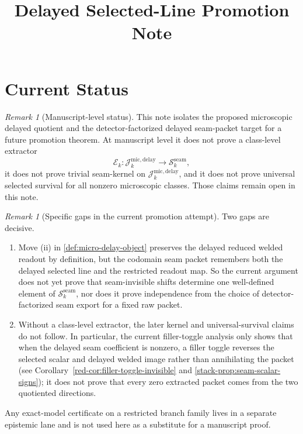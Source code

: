 \documentclass[11pt]{article}
\title{Delayed Selected-Line Promotion Note}
\author{}
\date{}
\theoremstyle{definition}
\theoremstyle{plain}
\theoremstyle{remark}
\newtheorem{remark}[definition]{Remark}
\begin{document}
\maketitle

\section{Current Status}

\begin{remark}[Manuscript-level status]
\label{rem:promotion-manuscript-status}
This note isolates the proposed microscopic delayed quotient and the detector-factorized delayed
seam-packet target for a future promotion theorem.
At manuscript level it does not prove a class-level extractor
\[
\mathcal E_k:
\mathcal J^{\mathrm{mic,delay}}_k
\longrightarrow
\mathcal S^{\mathrm{seam}}_k,
\]
it does not prove trivial seam-kernel on \(\mathcal J^{\mathrm{mic,delay}}_k\), and it does not
prove universal selected survival for all nonzero microscopic classes.
Those claims remain open in this note.
\end{remark}

\begin{remark}[Specific gaps in the current promotion attempt]
\label{rem:promotion-gaps}
Two gaps are decisive.
\begin{enumerate}[leftmargin=2em]
\item Move \textnormal{(ii)} in \cref{def:micro-delay-object} preserves the delayed reduced welded
  readout by definition, but the codomain seam packet remembers both the delayed selected line and
  the restricted readout map.
  So the current argument does not yet prove that seam-invisible shifts determine one well-defined
  element of \(\mathcal S^{\mathrm{seam}}_k\), nor does it prove independence from the choice of
  detector-factorized seam export for a fixed raw packet.
\item Without a class-level extractor, the later kernel and universal-survival claims do not
  follow.
  In particular, the current filler-toggle analysis only shows that when the delayed seam
  coefficient is nonzero, a filler toggle reverses the selected scalar and delayed welded image
  rather than annihilating the packet
  \textup{(see Corollary~\ref*{red-cor:filler-toggle-invisible} and \cref{stack-prop:seam-scalar-signs})};
  it does not prove that every zero extracted packet comes from the two quotiented directions.
\end{enumerate}
Any exact-model certificate on a restricted branch family lives in a separate epistemic lane and is
not used here as a substitute for a manuscript proof.
\end{remark}
\end{document}
